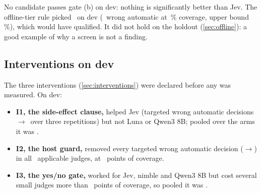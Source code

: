 No candidate passes gate (b) on dev: nothing is significantly better than Jev. The offline-tier rule
picked \OffBestDev\ on dev (\QwenFourDevOffWaK\ wrong automatic at \QwenFourDevOffCov\,\% coverage, upper
bound \QwenFourDevOffWaUpper\,\%), which would have qualified. It did not hold on the holdout
(\cref{sec:offline}): a good example of why a screen is not a finding.

\subsection{Interventions on dev}

The three interventions (\cref{sec:interventions}) were declared before any was measured. On dev:
\begin{itemize}
  \item \textbf{I1, the side-effect clause,} helped Jev (targeted wrong automatic decisions
    \IOneDevJevClBefore$\to$\IOneDevJevClAfter\ over three repetitions) but not Luna or Qwen3 8B; pooled over
    the arms it was \IOneDevConfirmed.
  \item \textbf{I2, the host guard,} removed every targeted wrong automatic decision
    (\ITwoDevBefore$\to$\ITwoDevAfter) in all \ITwoDevNApplicable\ applicable judges, at
    \ITwoDevCovCostRange\ points of coverage.
  \item \textbf{I3, the yes/no gate,} worked for Jev, nimble and Qwen3 8B but cost several small judges
    more than \IConfirmCovPts\ points of coverage, so pooled it was \IThreeDevConfirmed.
\end{itemize}
